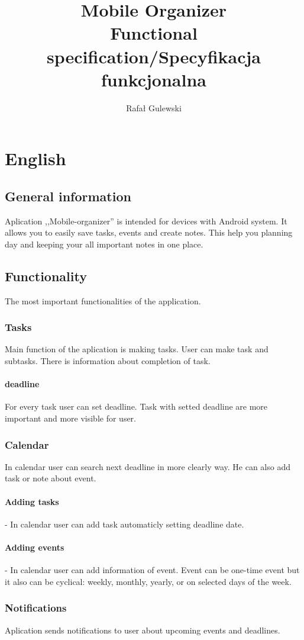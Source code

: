 \documentclass[a4paper,11pt]{article}
\author{Rafał Gulewski}
\title{\textbf{Mobile Organizer} \\ Functional specification/Specyfikacja funkcjonalna}
\begin{document}
\maketitle
\tableofcontents
\pagebreak
\section{English}
\subsection{General information}
Aplication ,,Mobile-organizer'' is intended for devices with Android system. It allows you to easily save tasks, events and create notes. This help you planning day and keeping your all important notes in one place.
\subsection{Functionality}
The most important functionalities of the application.
\subsubsection{Tasks}
Main function of the aplication is making tasks. User can make task and subtasks. There is information about completion of task.
\paragraph{deadline}
For every task user can set deadline. Task with setted deadline are more important and more visible for user.
\subsubsection{Calendar}
In calendar user can search next deadline in more clearly way. He can also add task or note about event.
\paragraph{Adding tasks} - In calendar user can add task automaticly setting deadline date.
\paragraph{Adding events} - In calendar user can add information of event. Event can be one-time event but it also can be cyclical: weekly, monthly, yearly, or on selected days of the week.
\subsubsection{Notifications}
Aplication sends notifications to user about upcoming events and deadlines.
\end{document}
